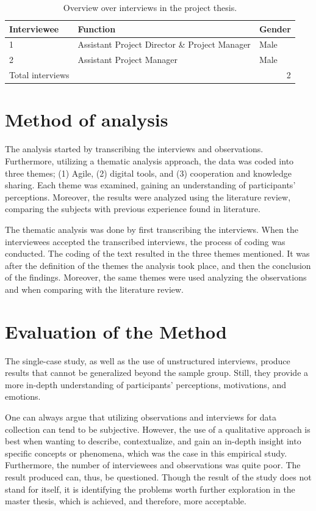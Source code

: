 \begin{table}
    \begin{center}
        \begin{tabular}{@{}lll@{}}
        \toprule
        \textbf{Interviewee} & \textbf{Function}          & \textbf{Gender} \\ \midrule
        1                    & Assistant Project Director \& Project Manager & Male            \\
        2                    & Assistant Project Manager  & Male            \\
        Total interviews     & \multicolumn{2}{r}{2}                        \\ \bottomrule
        \end{tabular}
        \caption{Overview over interviews in the project thesis.}
        \label{tab:paticipants}
    \end{center}
\end{table}

\section{Method of analysis}
The analysis started by transcribing the interviews and observations. Furthermore, utilizing a thematic analysis approach, the data was coded into three themes; (1) Agile, (2) digital tools, and (3) cooperation and knowledge sharing. Each theme was examined, gaining an understanding of participants' perceptions. Moreover, the results were analyzed using the literature review, comparing the subjects with previous experience found in literature. 

The thematic analysis was done by first transcribing the interviews. When the interviewees accepted the transcribed interviews, the process of coding was conducted. The coding of the text resulted in the three themes mentioned. It was after the definition of the themes the analysis took place, and then the conclusion of the findings. Moreover, the same themes were used analyzing the observations and when comparing with the literature review.

\section{Evaluation of the Method}
The single-case study, as well as the use of unstructured interviews, produce results that cannot be generalized beyond the sample group. Still, they provide a more in-depth understanding of participants’ perceptions, motivations, and emotions. 

One can always argue that utilizing observations and interviews for data collection can tend to be subjective. However, the use of a qualitative approach is best when wanting to describe, contextualize, and gain an in-depth insight into specific concepts or phenomena, which was the case in this empirical study. Furthermore, the number of interviewees and observations was quite poor. The result produced can, thus, be questioned. Though the result of the study does not stand for itself, it is identifying the problems worth further exploration in the master thesis, which is achieved, and therefore, more acceptable.

\cleardoublepage